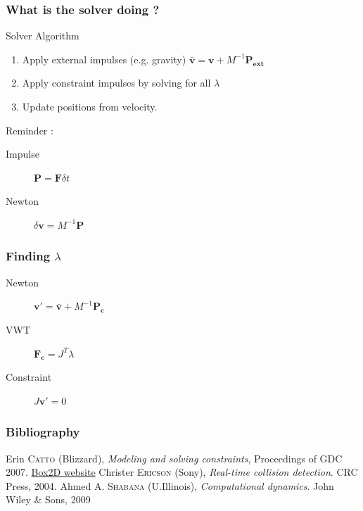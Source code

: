 \documentclass{beamer}
\begin{document}
\begin{frame}
 \frametitle{What is the solver doing ?}
 \begin{block}{Solver Algorithm}
 \begin{enumerate}
  \item Apply external impulses (e.g. gravity) $\bar{\mathbf{v}} = \mathbf{v} + M^{-1} \mathbf{P_{ext}}$
  \item Apply constraint impulses by solving for all $\lambda$
  \item Update positions from velocity.
 \end{enumerate}
 \end{block}
 Reminder :
 \begin{description}
    \item[Impulse] $\mathbf{P} = \mathbf{F} \delta t$
    \item[Newton] $\delta \mathbf{v} = M^{-1} \mathbf{P}$
 \end{description}
\end{frame}

\begin{frame}
 \frametitle{Finding $\lambda$}
  \begin{description}
   \item[Newton] $\mathbf{v'} = \bar{\mathbf{v}} + M^{-1} \mathbf{P_{c}}$
   \item[VWT] $\mathbf{F_c} = J^T \lambda$
   \item[Constraint] $J\mathbf{v'} = 0$
  \end{description}  
\end{frame}



\begin{frame}
 \frametitle{Bibliography} 
  \begin{thebibliography}{9}
   Erin \textsc{Catto} (Blizzard), \emph{Modeling and solving constraints}, Proceedings of GDC 2007. \href{http://box2d.org/downloads/}{Box2D website}
   Christer \textsc{Ericson} (Sony), \emph{Real-time collision detection}. CRC Press, 2004.
   Ahmed A. \textsc{Shabana} (U.Illinois), \emph{Computational dynamics}. John Wiley \& Sons, 2009
  \end{thebibliography}
\end{frame}
\end{document}
